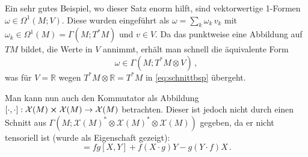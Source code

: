 \documentclass[../H_Analysis_main.tex]{subfiles}
\begin{document}
\begin{bsp}
Ein sehr gutes Beispiel, wo dieser Satz enorm hilft, sind vektorwertige 1-Formen  $\omega \in \Omega^1(M; V)$. Diese wurden eingeführt als $\omega = \sum_k \omega_k \, v_k$ mit $\omega_k \in \Omega^1(M) = \Gamma(M; T^*M)$ und $v \in V$. Da das punktweise eine Abbildung auf $TM$ bildet, die Werte in $V$ annimmt, erhält man schnell die äquivalente Form
\begin{equation}
\omega \in \Gamma(M; T^*M \otimes V) \, ,
\end{equation}
was für $V = \mathbb{R}$ wegen $T^*M \otimes \mathbb{R} = T^*M$ in \eqref{eq:schnittbsp} übergeht.


%
%
%
%


Man kann nun auch den Kommutator als Abbildung $\qty[\cdot, \cdot]: \mathcal{X}(M) \cross \mathcal{X}(M) \rightarrow \mathcal{X}(M)$ betrachten. Dieser ist jedoch nicht durch einen Schnitt aus $\Gamma(M; \mathcal{X}(M)^* \otimes \mathcal{X}(M)^* \otimes \mathcal{X}(M))$ gegeben, da er nicht tensoriell ist (wurde als Eigenschaft gezeigt):
\begin{equation*}
[f X, g Y] = fg [X, Y] + f (X \cdot g) Y - g (Y \cdot f) X \, .
\end{equation*}
\end{bsp}
\end{document}
